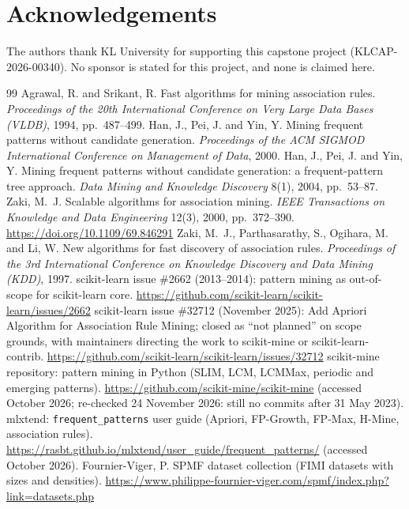 \documentclass[twocolumn,10pt]{article}
\begin{document}
\section*{Acknowledgements}
The authors thank KL University for supporting this capstone
project (KLCAP-2026-00340). No sponsor is stated for
this project, and none is claimed here.

\begin{thebibliography}{99}
 Agrawal, R. and Srikant, R. Fast algorithms for
mining association rules. \emph{Proceedings of the 20th International
Conference on Very Large Data Bases (VLDB)}, 1994, pp.~487--499.
 Han, J., Pei, J. and Yin, Y. Mining frequent patterns
without candidate generation. \emph{Proceedings of the ACM SIGMOD
International Conference on Management of Data}, 2000.
 Han, J., Pei, J. and Yin, Y. Mining frequent patterns
without candidate generation: a frequent-pattern tree approach.
\emph{Data Mining and Knowledge Discovery} 8(1), 2004, pp.~53--87.
 Zaki, M.~J. Scalable algorithms for association
mining. \emph{IEEE Transactions on Knowledge and Data Engineering}
12(3), 2000, pp.~372--390. \url{https://doi.org/10.1109/69.846291}
 Zaki, M.~J., Parthasarathy, S., Ogihara, M. and
Li, W. New algorithms for fast discovery of association rules.
\emph{Proceedings of the 3rd International Conference on Knowledge
Discovery and Data Mining (KDD)}, 1997.
 scikit-learn issue \#2662 (2013--2014): pattern
mining as out-of-scope for scikit-learn core.
\url{https://github.com/scikit-learn/scikit-learn/issues/2662}
 scikit-learn issue \#32712 (November 2025): Add
Apriori Algorithm for Association Rule Mining; closed as ``not
planned'' on scope grounds, with maintainers directing the work to
scikit-mine or scikit-learn-contrib.
\url{https://github.com/scikit-learn/scikit-learn/issues/32712}
 scikit-mine repository: pattern mining in Python
(SLIM, LCM, LCMMax, periodic and emerging patterns).
\url{https://github.com/scikit-mine/scikit-mine} (accessed October 2026; re-checked 24 November 2026:
still no commits after 31 May 2023).
 mlxtend: \texttt{frequent\_patterns} user guide
(Apriori, FP-Growth, FP-Max, H-Mine, association rules).
\url{https://rasbt.github.io/mlxtend/user_guide/frequent_patterns/}
(accessed October 2026).
 Fournier-Viger, P. SPMF dataset collection (FIMI
datasets with sizes and densities).
\url{https://www.philippe-fournier-viger.com/spmf/index.php?link=datasets.php}

\end{thebibliography}
\end{document}
